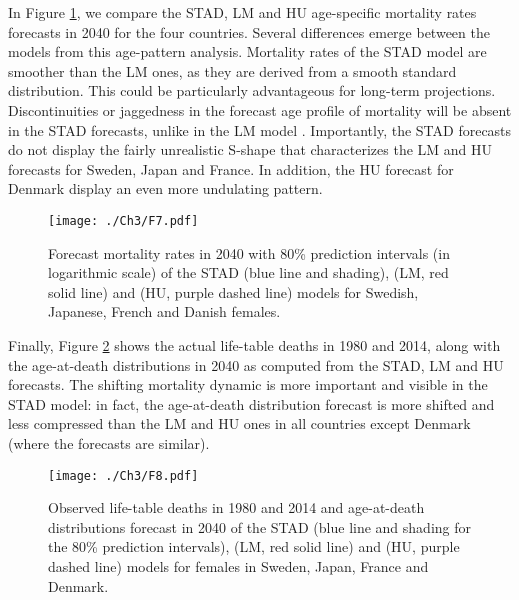 \documentclass[Thesis]{subfiles}
\begin{document}
In Figure \ref{Fig:MxFore}, we compare the STAD, LM and HU age-specific mortality rates forecasts in 2040 for the four countries. Several differences emerge between the models from this age-pattern analysis. Mortality rates of the STAD model are smoother than the LM ones, as they are derived from a smooth standard distribution. This could be particularly advantageous for long-term projections. Discontinuities or jaggedness in the forecast age profile of mortality will be absent in the STAD forecasts, unlike in the LM model \citep{li2013extending}. Importantly, the STAD forecasts do not display the fairly unrealistic S-shape that characterizes the LM and HU forecasts for Sweden, Japan and France. In addition, the HU forecast for Denmark display an even more undulating pattern.

\begin{figure}[!ht]
	\begin{center}
		\texttt{[image: ./Ch3/F7.pdf]} 		     
		
		\caption{Forecast mortality rates in 2040 with 80\% prediction intervals (in logarithmic scale)
			of the STAD (blue line and shading), \citeauthor{lee2001evaluating} (LM, red solid line) and \citeauthor{hyndman2007robust} (HU, purple dashed line) models for Swedish, Japanese, French
			and Danish females.\label{Fig:MxFore}} 
	\end{center}  
\end{figure}

Finally, Figure \ref{Fig:DxFore} shows the actual life-table deaths in 1980 and 2014, along with the age-at-death distributions in 2040 as computed from the STAD, LM and HU forecasts. The shifting mortality dynamic is more important and visible in the STAD model: in fact, the age-at-death distribution forecast is more shifted and less compressed than the LM and HU ones in all countries except Denmark (where the forecasts are similar).	

\begin{figure}[!ht]
	\begin{center}
		
		\texttt{[image: ./Ch3/F8.pdf]}
		
		
		\caption{Observed life-table deaths in 1980 and 2014 and age-at-death distributions forecast in 2040 of the STAD (blue line and shading for the 80\% prediction intervals), \citeauthor{lee2001evaluating} (LM, red solid line) and \citeauthor{hyndman2007robust} (HU, purple dashed line) models for females in Sweden, Japan, France and Denmark.}\label{Fig:DxFore} 
		
	\end{center}
\end{figure}
\end{document}
